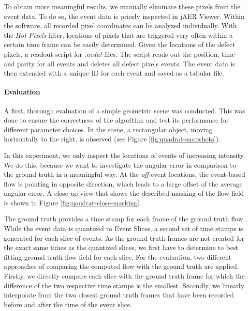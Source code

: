 To obtain more meaningful results, we manually eliminate these pixels from the event data.
To do so, the event data is priorly inspected in jAER Viewer. 
Within the software, all recorded pixel coordinates can be analyzed individually.
With the \textit{Hot Pixels} filter, locations of pixels that are triggered very often within a certain time frame can be easily determined.
Given the locations of the defect pixels, a readout script for \textit{.aedat} files. 
The script reads out the position, time and parity for all events and deletes all defect pixels events.
The event data is then extended with a unique ID for each event and saved as a tabular file.


\paragraph{Evaluation}
A first, thorough evaluation of a simple geometric scene was conducted.
This was done to ensure the correctness of the algorithm and test its performance for different parameter choices.
In the scene, a rectangular object, moving horizontally to the right, is observed (see Figure \ref{fig:quadrat-snapshots}).


In this experiment, we only inspect the locations of events of increasing intensity.
We do this, because we want to investigate the angular error in comparison to the ground truth in a meaningful way. 
At the \textit{off}-event locations, the event-based flow is pointing in opposite direction, which leads to a large offset of the average angular error. 
A close-up view that shows the described masking of the flow field is shown in Figure \ref{fig:qaudrat-close-masking}.


The ground truth provides a time stamp for each frame of the ground truth flow.
While the event data is quantized to Event Slices, a second set of time stamps is generated for each slice of events.
As the ground truth frames are not created for the exact same times as the quantized slices, we first have to determine to best fitting ground truth flow field for each slice.
For the evaluation, two different approaches of comparing the computed flow with the ground truth are applied.
Firstly, we directly compare each slice with the ground truth frame for which the difference of the two respective time stamps is the smallest.
Secondly, we linearly interpolate from the two closest ground truth frames that have been recorded before and after the time of the event slice.


